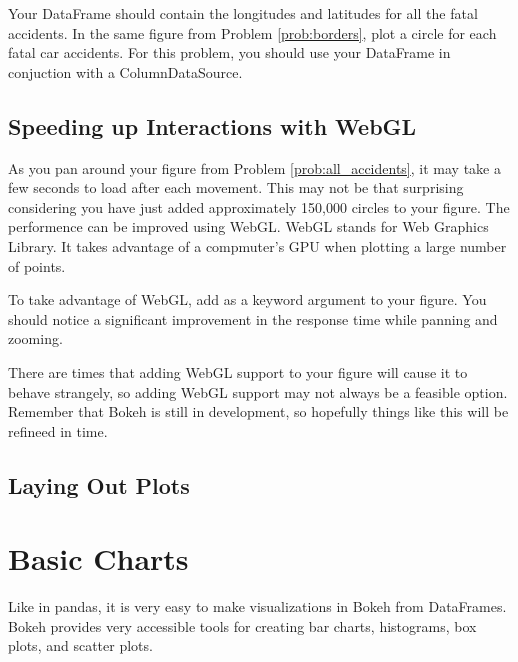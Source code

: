 \begin{problem} \label{prob:all_accidents}
Your  DataFrame should contain the longitudes and latitudes for
all the fatal accidents. In the same figure from Problem \ref{prob:borders},
plot a circle for each fatal car accidents. For this problem, you should use
your  DataFrame in conjuction with a ColumnDataSource.
\end{problem}

\subsection*{Speeding up Interactions with WebGL}
As you pan around your figure from Problem \ref{prob:all_accidents}, it may take
a few seconds to load after each movement. This may not be that surprising
considering you have just added approximately 150,000 circles to your figure.
The performence can be improved using WebGL. WebGL stands for Web Graphics
Library. It takes advantage of a compmuter's GPU when plotting a large number of
points.

\begin{problem} \label{prob:webgl}
To take advantage of WebGL, add  as a keyword argument to
your figure. You should notice a significant improvement in the response time
while panning and zooming.

\begin{info}
There are times that adding WebGL support to your figure will cause it to behave
strangely, so adding WebGL support may not always be a feasible option. Remember
that Bokeh is still in development, so hopefully things like this will be refineed
in time.
\end{info}
\end{problem}

\subsection*{Laying Out Plots}

\section*{Basic Charts}
Like in pandas, it is very easy to make visualizations in Bokeh from DataFrames.
Bokeh provides very accessible tools for creating bar charts, histograms, box
plots, and scatter plots.

